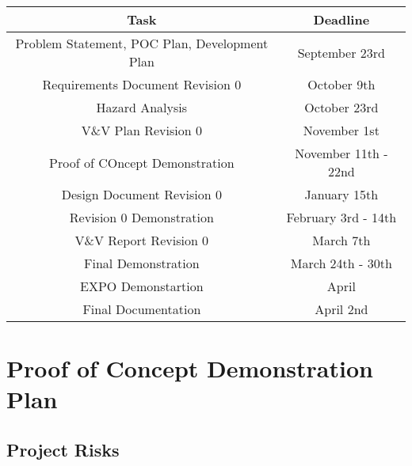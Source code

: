 \documentclass{article}
\begin{document}
\begin{center}
	\begin{tabular}{ |c|c| }
		\hline
		\textbf{Task} 								  & \textbf{Deadline} \\
		\hline
		Problem Statement, POC Plan, Development Plan & September 23rd	  	  \\
		Requirements Document Revision 0 			  & October 9th    	 	  \\
		Hazard Analysis 							  & October 23rd          \\
		V\&V Plan Revision 0 						  & November 1st   	      \\
		Proof of COncept Demonstration				  & November 11th - 22nd  \\
		Design Document Revision 0 					  & January 15th	      \\
		Revision 0 Demonstration  					  & February 3rd - 14th   \\
		V\&V Report Revision 0 						  & March 7th   	      \\
		Final Demonstration 						  & March 24th - 30th     \\
		EXPO Demonstartion 							  & April	              \\
		Final Documentation 						  & April 2nd   	      \\
		\hline
	\end{tabular}
\end{center}


\section{Proof of Concept Demonstration Plan}

\subsection{Project Risks}
\end{document}
